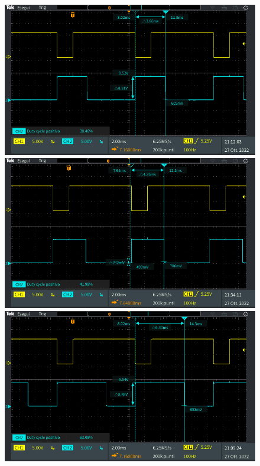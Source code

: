 \begin{figure}[h]
	\centering
	\begin{minipage}{.496\textwidth}
		\includegraphics[width=\linewidth]{./ImageFiles/Laboratorio 4/TEK00015.PNG}
	\end{minipage}
	\begin{minipage}{.496\textwidth}
		\includegraphics[width=\linewidth]{./ImageFiles/Laboratorio 4/TEK00022.PNG}
	\end{minipage}
	\begin{minipage}{.496\textwidth}
		\includegraphics[width=\linewidth]{./ImageFiles/Laboratorio 4/TEK00014.PNG}

\end{minipage}
\end{figure}
